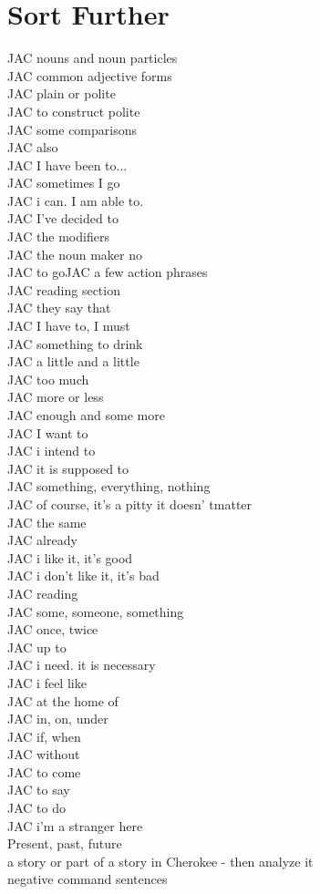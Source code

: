 \chapter{Sort Further}
JAC nouns and noun particles\\
JAC common adjective forms\\
JAC plain or polite\\
JAC to construct polite\\
JAC some comparisons\\
JAC also\\
JAC I have been to...\\
JAC sometimes I go\\
JAC i can.  I am able to.\\
JAC I've decided to\\
JAC the modifiers\\
JAC the noun maker no\\
JAC to goJAC a few action phrases\\
JAC reading section\\
JAC they say that\\
JAC I have to, I must\\
JAC something to drink\\
JAC a little and a little\\
JAC too much\\
JAC more or less\\
JAC enough and some more\\
JAC I want to\\
JAC i intend to\\
JAC it is supposed to\\
JAC something, everything, nothing\\
JAC of course, it's a pitty it doesn' tmatter\\
JAC the same\\
JAC already\\
JAC i like it, it's good\\
JAC i don't like it, it's bad\\
JAC reading\\
JAC some, someone, something\\
JAC once, twice\\
JAC up to\\
JAC i need. it is necessary\\
JAC i feel like\\
JAC at the home of\\
JAC in, on, under\\
JAC if, when\\
JAC without\\
JAC to come\\
JAC to say\\
JAC to do\\
JAC i'm a stranger here\\
Present, past, future\\
a story or part of a story in Cherokee - then analyze it\\
negative command sentences\\

